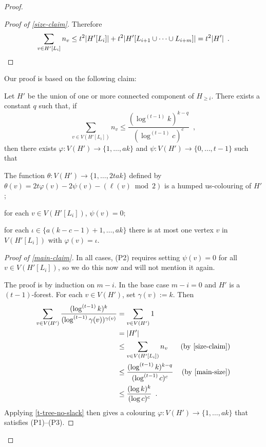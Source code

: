 \documentclass[kpfonts]{patmorin}
\theoremstyle{named}
\begin{document}
\begin{proof}
\begin{proof}[Proof of \cref{size-claim}]
        Therefore
        \[
            \sum_{v\in H'[L_i]} n_v \le t^2|H'[L_i]| + t^2|H'[L_{i+1}\cup\cdots\cup L_{i+m}]| = t^2|H'| \enspace . \qedhere
        \]
    \end{proof}

Our proof is based on the following claim:

    \begin{clm}\label{main-claim}
        Let $H'$ be the union of one or more connected component of $H_{\ge i}$. There exists a constant $q$ such that,  if
        \begin{equation}
            \sum_{v\in V(H'[L_i])} n_v\le \frac{(\log^{(t-1)} k)^{k-q}}{(\log^{(t-1)} c)^c} \enspace , \label{main-size}
        \end{equation}
        then there exists $\varphi:V(H')\to\{1,\ldots,ak\}$ and $\psi:V(H')\to\{0,\ldots,t-1\}$ such that
        \begin{compactenum}[(P1)]
            \item The function $\theta:V(H')\to\{1,\ldots,2tak\}$ defined by $\theta(v)=2t\varphi(v) - 2\psi(v) -(\ell(v)\bmod 2)$ is a humped us-colouring of $H'$;
            \item for each $v\in V(H'[L_i])$, $\psi(v)=0$;
            \item for each $\iota\in\{a(k-c-1)+1,\ldots,ak\}$ there is at most one vertex $v$ in $V(H'[L_i])$ with $\varphi(v)=\iota$.
        \end{compactenum}
    \end{clm}

    \begin{proof}[Proof of \cref{main-claim}]
        In all cases, (P2) requires setting $\psi(v)=0$ for all $v\in V(H'[L_i])$, so we do this now and will not mention it again.

        The proof is by induction on $m-i$. In the base case $m-i=0$ and $H'$ is a $(t-1)$-forest.
        For each $v\in V(H')$, set  $\gamma(v):=k$.  Then
        \begin{align*}
            \sum_{v\in V(H')} \frac{(\log^{(t-1)} k)^k}{(\log^{(t-1)} \gamma(v))^{\gamma(v)}}
            & = \sum_{v\in V(H')} 1 \\
            & = |H'| \\
            & \le \sum_{v\in V(H'[L_i])} n_v  & \text{(by \cref{size-claim})}\\
            & \le \frac{(\log^{(t-1)} k)^{k-q}}{(\log^{(t-1)} c)^c} & \text{(by \cref{main-size})}\\
            & \le \frac{(\log k)^{k}}{(\log c)^c} \enspace .
        \end{align*}
        Applying \cref{t-tree-no-slack} then gives a colouring $\varphi: V(H')\to\{1,\ldots,ak\}$ that satisfies (P1)--(P3).


\end{proof}
\end{proof}
\end{document}
